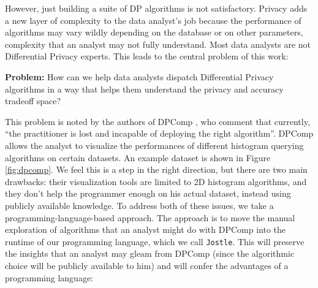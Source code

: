 \documentclass[11pt]{article}
\newcommand{\Jostle}{\texttt{Jostle}}
\begin{document}
However, just building a suite of DP algorithms is not satisfactory. Privacy adds a new layer of complexity to the data analyst's job because the performance of algorithms may vary wildly depending on the database or on other parameters, complexity that an analyst may not fully understand. Most data analysts are not Differential Privacy experts. This leads to the central problem of this work: 

\textbf{Problem:} How can we help data analysts dispatch Differential Privacy algorithms in a way that helps them understand the privacy and accuracy tradeoff space?

This problem is noted by the authors of DPComp \cite{Hay:2016}, who comment that currently, ``the practitioner is lost and incapable of deploying the right algorithm''. DPComp allows the analyst to visualize the performances of different histogram querying algorithms on certain datasets. An example dataset  is shown in Figure \ref{fig:dpcomp}. We feel this is a step in the right direction, but there are two main drawbacks: their visualization tools are limited to 2D histogram algorithms, and they don't help the programmer enough on his actual dataset, instead using publicly available knowledge. To address both of these issues, we take a programming-language-based approach. The approach is to move the manual exploration of algorithms that an analyst might do with DPComp into the runtime of our programming language, which we call \Jostle{}. This will preserve the insights that an analyst may gleam from DPComp (since the algorithmic choice will be publicly available to him) and will confer the advantages of a programming language:
\end{document}
